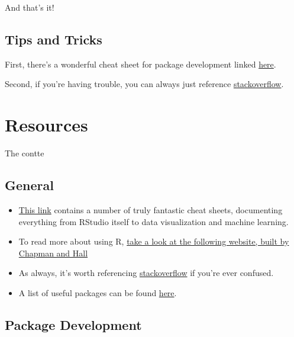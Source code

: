 \documentclass[
]{book}
\begin{document}
And that's it!

\hypertarget{tips-and-tricks-1}{%
\section{Tips and Tricks}\label{tips-and-tricks-1}}

First, there's a wonderful cheat sheet for package development linked \href{https://www.rstudio.com/wp-content/uploads/2015/06/devtools-cheatsheet.pdf}{here}.

Second, if you're having trouble, you can always just reference \href{https://stackoverflow.com/questions/tagged/r}{stackoverflow}.

\hypertarget{resources}{%
\chapter{Resources}\label{resources}}

The contte

\hypertarget{general}{%
\section{General}\label{general}}

\begin{itemize}
\item
  \href{https://www.rstudio.com/resources/cheatsheets/}{This link} contains a number of truly fantastic cheat sheets, documenting everything from RStudio itself to data visualization and machine learning.
\item
  To read more about using R, \href{http://adv-r.had.co.nz/}{take a look at the following website, built by Chapman and Hall}
\item
  As always, it's worth referencing \href{https://stackoverflow.com/questions/tagged/r/}{stackoverflow} if you're ever confused.
\item
  A list of useful packages can be found \href{https://support.rstudio.com/hc/en-us/articles/201057987-Quick-list-of-useful-R-packages}{here}.
\end{itemize}

\hypertarget{package-development-1}{%
\section{Package Development}\label{package-development-1}}
\end{document}
